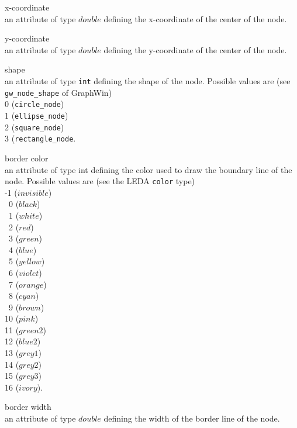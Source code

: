 \begin{description}

\item{x-coordinate}\\
an attribute of type $double$ defining the x-coordinate of the center 
of the node.

\item{y-coordinate}\\
an attribute of type $double$ defining the y-coordinate of the center 
of the node.

\item{shape}\\
an attribute of type {\tt int} 
defining the shape of the node.
Possible values are  (see {\tt gw\_node\_shape} of GraphWin)\\
0 ({\tt circle\_node})\\
1 ({\tt ellipse\_node})\\
2 ({\tt square\_node})\\
3 ({\tt rectangle\_node}.


\item{border color}\\
an attribute of type int defining the color used to draw the boundary line 
of the node. Possible values are (see the LEDA {\tt color} type)\\
 -1 ($invisible$)\\
\ 0 ($black$)\\ 
\ 1 ($white$)\\ 
\ 2 ($red$)\\ 
\ 3 ($green$)\\ 
\ 4 ($blue$)\\ 
\ 5 ($yellow$)\\ 
\ 6 ($violet$)\\ 
\ 7 ($orange$)\\
\ 8 ($cyan$)\\ 
\ 9 ($brown$)\\ 
 10 ($pink$)\\ 
 11 ($green2$)\\ 
 12 ($blue2$)\\ 
 13 ($grey1$)\\ 
 14 ($grey2$)\\ 
 15 ($grey3$)\\
 16 ($ivory$).


\item{border width}\\
an attribute of type $double$ defining the width of the  border line 
of the node. 


\end{description}
